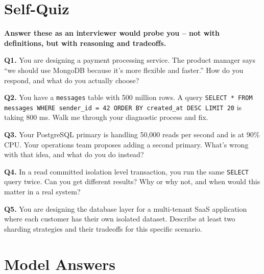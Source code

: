 \documentclass[11pt,a4paper]{article}
\begin{document}
\section{Self-Quiz}

\begin{quizbox}
\textbf{Answer these as an interviewer would probe you -- not with definitions, but with reasoning and tradeoffs.}

\vspace{6pt}
\textbf{Q1.} You are designing a payment processing service. The product manager says ``we should use MongoDB because it's more flexible and faster.'' How do you respond, and what do you actually choose?

\vspace{10pt}
\textbf{Q2.} You have a \texttt{messages} table with 500 million rows. A query \texttt{SELECT * FROM messages WHERE sender\_id = 42 ORDER BY created\_at DESC LIMIT 20} is taking 800 ms. Walk me through your diagnostic process and fix.

\vspace{10pt}
\textbf{Q3.} Your PostgreSQL primary is handling 50,000 reads per second and is at 90\% CPU. Your operations team proposes adding a second primary. What's wrong with that idea, and what do you do instead?

\vspace{10pt}
\textbf{Q4.} In a read committed isolation level transaction, you run the same \texttt{SELECT} query twice. Can you get different results? Why or why not, and when would this matter in a real system?

\vspace{10pt}
\textbf{Q5.} You are designing the database layer for a multi-tenant SaaS application where each customer has their own isolated dataset. Describe at least two sharding strategies and their tradeoffs for this specific scenario.
\end{quizbox}

\newpage

\section*{Model Answers}
\end{document}
